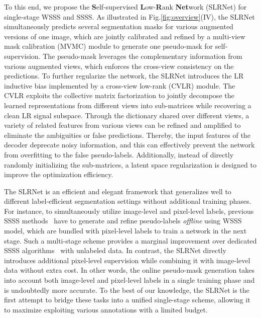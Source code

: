 \documentclass[twocolumn]{svjour3}          \smartqed  \usepackage{graphicx}
\makeatletter
\newcommand{\Fig}{Fig.\@\xspace}
\newcommand{\prelim}[1]{{#1}}
\makeatother
\begin{document}
To this end, we propose the \textbf{S}elf-supervised \textbf{L}ow-\textbf{R}ank \textbf{Net}work (SLRNet) for single-stage WSSS and SSSS.
\prelim{
As illustrated in \Fig\ref{fig:overview}(IV),
the SLRNet simultaneously predicts several segmentation masks  for various augmented versions of one image, which are jointly calibrated and refined by a multi-view mask calibration (MVMC) module to generate one pseudo-mask for self-supervision.
The pseudo-mask leverages the complementary information from various augmented views, which enforces the cross-view consistency on the predictions.
To further regularize the network, the SLRNet introduces the LR inductive bias implemented by a cross-view low-rank (CVLR) module. 
The CVLR exploits the collective matrix factorization to jointly decompose the learned representations from different views into sub-matrices while recovering a clean LR signal subspace.
Through the dictionary shared over different views, a variety of related features from various views can be refined and amplified to eliminate the ambiguities or false predictions.
Thereby, the input features of the decoder deprecate noisy information, and this can effectively prevent the network from overfitting to the false pseudo-labels.
Additionally, instead of directly randomly initializing the sub-matrices, a latent space regularization is designed to improve the optimization efficiency.
}

\prelim{
The SLRNet is an efficient and elegant framework that generalizes well to different label-efficient segmentation settings without additional training phases.
For instance, to simultaneously utilize image-level and pixel-level labels, previous SSSS methods~\citep{LeeKLLY19:FickleNet,WeiXSJFH18:mdc} have to generate and refine pseudo-labels \textit{offline} using WSSS model, which are bundled with pixel-level labels to train a network in the next stage.
Such a multi-stage scheme provides a marginal improvement over dedicated SSSS algorithms~\citep{OualiHT20:CCT,zou2020:pseudoseg} with unlabeled data.
In contrast, the SLRNet directly introduces additional pixel-level supervision while combining it with image-level data without extra cost.
In other words, the online pseudo-mask generation takes into account both image-level and pixel-level labels in a single training phase and is undoubtedly more accurate.
To the best of our knowledge, the SLRNet is the first attempt to bridge these tasks into a unified single-stage scheme, allowing it to maximize exploiting various annotations with a limited budget. 
}
\end{document}
